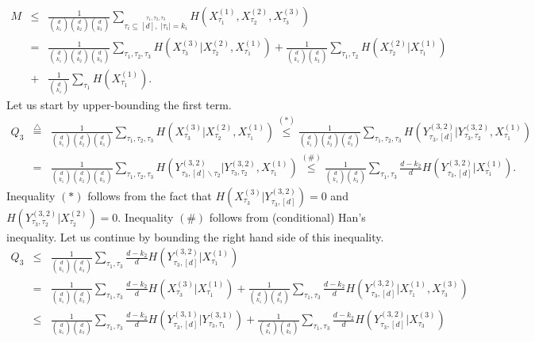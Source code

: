 \documentclass[journal,onecolumn,draftcls]{IEEEtran}
\begin{document}
\begin{IEEEproof}
\begin{eqnarray}
M&\le& \frac{1}{{d \choose k_1}{d \choose k_2}{d \choose k_3}}\sum_{\stackrel{\tau_1,\tau_2,\tau_3}{\tau_i\subseteq[d],\;|\tau_i|= k_i}}H(X^{(1)}_{\tau_1},X^{(2)}_{\tau_2},X^{(3)}_{\tau_3})\nonumber\\
&=& \frac{1}{{d \choose k_1}{d \choose k_2}{d \choose k_3}}\sum_{{\tau_1,\tau_2,\tau_3}}H(X^{(3)}_{\tau_3}|X^{(2)}_{\tau_2},X^{(1)}_{\tau_1}) + \frac{1}{{d \choose k_1}{d \choose k_2}}\sum_{{\tau_1,\tau_2}}H(X^{(2)}_{\tau_2}|X^{(1)}_{\tau_1})\nonumber \\&+& \frac{1}{{d \choose k_1}}\sum_{{\tau_1}}H(X^{(1)}_{\tau_1}).
\label{eqn:eq11}
\end{eqnarray}
Let us start by upper-bounding the first term.
\begin{eqnarray*}
Q_3 &\stackrel{\triangle}{=}&  \frac{1}{{d \choose k_1}{d \choose k_2}{d \choose k_3}}\sum_{{\tau_1,\tau_2,\tau_3}}H(X^{(3)}_{\tau_3}|X^{(2)}_{\tau_2},X^{(1)}_{\tau_1}) \stackrel{(*)}{\le}  \frac{1}{{d \choose k_1}{d \choose k_2}{d \choose k_3}}\sum_{{\tau_1,\tau_2,\tau_3}}H(Y^{(3,2)}_{\tau_3,[d]}|Y^{(3,2)}_{\tau_3,\tau_2},X^{(1)}_{\tau_1}) \\
 &= &  \frac{1}{{d \choose k_1}{d \choose k_2}{d \choose k_3}}\sum_{{\tau_1,\tau_2,\tau_3}}H(Y^{(3,2)}_{\tau_3,[d]\backslash\tau_2}|Y^{(3,2)}_{\tau_3,\tau_2},X^{(1)}_{\tau_1})
 \stackrel{(\#)}{\le}  \frac{1}{{d \choose k_1}{d \choose k_3}}\sum_{{\tau_1,\tau_3}}\frac{d-k_2}{d}H(Y^{(3,2)}_{\tau_3,[d]}|X^{(1)}_{\tau_1}).
  \end{eqnarray*}
Inequality $(*)$ follows from the fact that $H(X^{(3)}_{\tau_3}|Y^{(3,2)}_{\tau_3,[d]}) =0$ and $H(Y^{(3,2)}_{\tau_3,\tau_2}|X^{(2)}_{\tau_2}) = 0 $. Inequality $(\#)$ follows from (conditional) Han's inequality.
 Let us continue by bounding the right hand side of  this inequality.
\begin{eqnarray*}
Q_3&\le& \frac{1}{{d \choose k_1}{d \choose k_3}}\sum_{{\tau_1,\tau_3}}\frac{d-k_2}{d}H(Y^{(3,2)}_{\tau_3,[d]}|X^{(1)}_{\tau_1})\\ &=&  \frac{1}{{d \choose k_1}{d \choose k_3}}\sum_{{\tau_1,\tau_3}}\frac{d-k_2}{d}H(X^{(3)}_{\tau_3}|X^{(1)}_{\tau_1})+ \frac{1}{{d \choose k_1}{d \choose k_3}}\sum_{{\tau_1,\tau_3}}\frac{d-k_2}{d}H(Y^{(3,2)}_{\tau_3,[d]}|X^{(1)}_{\tau_1},X^{(3)}_{\tau_3})\\
 &\le& \frac{1}{{d \choose k_1}{d \choose k_3}}\sum_{{\tau_1,\tau_3}}\frac{d-k_2}{d}H(Y^{(3,1)}_{\tau_3,[d]}|Y^{(3,1)}_{\tau_3,\tau_1})+ \frac{1}{{d \choose k_1}{d \choose k_3}}\sum_{{\tau_1,\tau_3}}\frac{d-k_2}{d}H(Y^{(3,2)}_{\tau_3,[d]}|X^{(3)}_{\tau_3})\\

\end{eqnarray*}
\end{IEEEproof}
\end{document}
